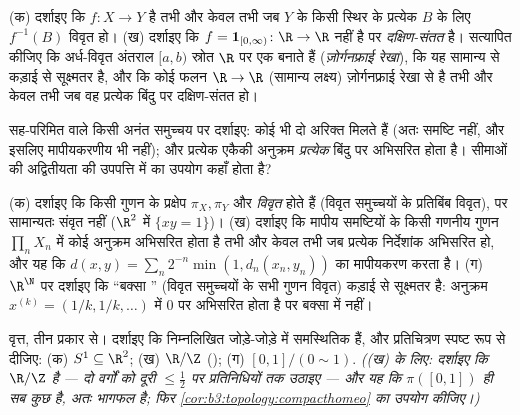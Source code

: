 \begin{exercise}[$\star$]\label{exo:b3:topology:2}
(क) दर्शाइए कि $f\colon X \to Y$  है तभी और केवल तभी जब $Y$ के किसी
स्थिर  के प्रत्येक $B$ के लिए $f^{-1}(B)$ विवृत हो।
(ख) दर्शाइए कि $f = \mathbf 1_{[0,\infty)} \colon \R \to \R$  नहीं है पर \emph{दक्षिण-संतत} है।
सत्यापित कीजिए कि अर्ध-विवृत अंतराल $[a, b)$ स्रोत $\R$ पर एक
 बनाते हैं (\emph{ज़ोर्गनफ्राई रेखा}), कि यह
 सामान्य  से कड़ाई से सूक्ष्मतर है, और कि कोई
फलन $\R \to
\R$ (सामान्य लक्ष्य) ज़ोर्गनफ्राई रेखा से  है तभी और
केवल तभी जब वह प्रत्येक बिंदु पर दक्षिण-संतत हो।
\end{exercise}

\begin{exercise}[$\star$]\label{exo:b3:topology:3}
सह-परिमित  वाले किसी अनंत समुच्चय पर दर्शाइए: कोई भी दो
अरिक्त  मिलते हैं (अतः समष्टि  नहीं, और
इसलिए मापीयकरणीय भी नहीं); और प्रत्येक एकैकी अनुक्रम
\emph{प्रत्येक} बिंदु पर अभिसरित होता है। सीमाओं की अद्वितीयता की
उपपत्ति में  का उपयोग कहाँ होता है?
\end{exercise}

\begin{exercise}[$\star\star$]\label{exo:b3:topology:4}
(क) दर्शाइए कि किसी गुणन के प्रक्षेप $\pi_X, \pi_Y$  और \emph{विवृत}
होते हैं (विवृत समुच्चयों के प्रतिबिंब विवृत), पर सामान्यतः संवृत
नहीं ($\R^2$ में $\{xy = 1\}$)।
(ख) दर्शाइए कि मापीय समष्टियों के किसी गणनीय गुणन $\prod_n X_n$ में कोई
अनुक्रम अभिसरित होता है तभी और केवल तभी जब प्रत्येक निर्देशांक
अभिसरित हो, और यह कि $d(x, y) = \sum_n 2^{-n}\min(1, d_n(x_n, y_n))$  का मापीयकरण करता है।
(ग) $\R^\N$ पर दर्शाइए कि ``बक्सा '' (विवृत समुच्चयों के
सभी गुणन विवृत) कड़ाई से सूक्ष्मतर है: अनुक्रम $x^{(k)} = (1/k, 1/k, \dots)$  में $0$ पर अभिसरित होता है पर बक्सा  में नहीं।
\end{exercise}

\begin{exercise}[$\star\star$]\label{exo:b3:topology:5}
वृत्त, तीन प्रकार से। दर्शाइए कि निम्नलिखित जोड़े-जोड़े में
समस्थितिक हैं, और प्रतिचित्रण स्पष्ट रूप से दीजिए: (क) $S^1 \subseteq \R^2$;
(ख) $\R/\Z$ (); (ग) $[0,1]/(0 \sim 1)$. \emph{((ख) के लिए:
दर्शाइए कि $\R/\Z$  है --- दो वर्गों को दूरी $\leq \frac12$ पर
प्रतिनिधियों तक उठाइए --- और यह कि $\pi([0,1])$ ही सब कुछ है, अतः भागफल
 है; फिर \cref{cor:b3:topology:compacthomeo} का उपयोग कीजिए।)}
\end{exercise}

